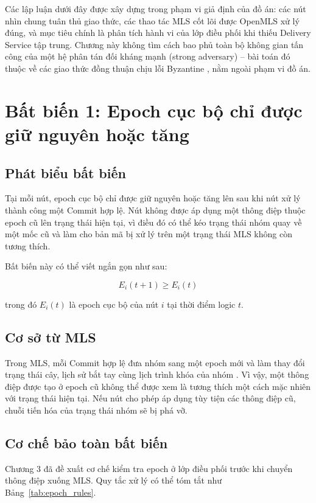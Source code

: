 \documentclass[../DoAn.tex]{subfiles}
\begin{document}
Các lập luận dưới đây được xây dựng trong phạm vi giả định của đồ án: các nút nhìn chung tuân thủ giao thức, các thao tác MLS cốt lõi được OpenMLS xử lý đúng, và mục tiêu chính là phân tích hành vi của lớp điều phối khi thiếu Delivery Service tập trung. Chương này không tìm cách bao phủ toàn bộ không gian tấn công của một hệ phân tán đối kháng mạnh (strong adversary) -- bài toán đó thuộc về các giao thức đồng thuận chịu lỗi Byzantine \cite{castro1999pbft}, nằm ngoài phạm vi đồ án.

\section{Bất biến 1: Epoch cục bộ chỉ được giữ nguyên hoặc tăng}
\label{sec:bat_bien_epoch_monotonicity}

\subsection{Phát biểu bất biến}

Tại mỗi nút, epoch cục bộ chỉ được giữ nguyên hoặc tăng lên sau khi nút xử lý thành công một Commit hợp lệ. Nút không được áp dụng một thông điệp thuộc epoch cũ lên trạng thái hiện tại, vì điều đó có thể kéo trạng thái nhóm quay về một mốc cũ và làm cho bản mã bị xử lý trên một trạng thái MLS không còn tương thích.

Bất biến này có thể viết ngắn gọn như sau:

\[
E_i(t + 1) \geq E_i(t)
\]

trong đó $E_i(t)$ là epoch cục bộ của nút $i$ tại thời điểm logic $t$.

\subsection{Cơ sở từ MLS}

Trong MLS, mỗi Commit hợp lệ đưa nhóm sang một epoch mới và làm thay đổi trạng thái cây, lịch sử bắt tay cùng lịch trình khóa của nhóm \cite{rfc9420}. Vì vậy, một thông điệp được tạo ở epoch cũ không thể được xem là tương thích một cách mặc nhiên với trạng thái hiện tại. Nếu nút cho phép áp dụng tùy tiện các thông điệp cũ, chuỗi tiến hóa của trạng thái nhóm sẽ bị phá vỡ.

\subsection{Cơ chế bảo toàn bất biến}

Chương 3 đã đề xuất cơ chế kiểm tra epoch ở lớp điều phối trước khi chuyển thông điệp xuống MLS. Quy tắc xử lý có thể tóm tắt như Bảng~\ref{tab:epoch_rules}.
\end{document}
